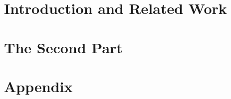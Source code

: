 \documentclass[11pt,a4paper,bibtotoc,idxtotoc,headsepline,footsepline,footexclude,BCOR12mm,DIV13]{scrbook}
\begin{document}
	\frontmatter
	
	
	
%	
%	
	
	
%	
	\clearemptydoublepage
	
	
	
	
	
	
	
	
	

	\tableofcontents
  
  

	\mainmatter
	
	
		\part[Introduction and Theory]{Introduction and Related Work}
		\label{part:introAndBackgroundTheory}
                
		
                
                

                                
		\part[The 2nd Part]{The Second Part}
		\label{part:secondP}
                
		
		
		
		\part*{Appendix}
		
		\appendix %
		
		
                
                
                
		
	


  \clearemptydoublepage
  
	
	
 
\end{document}
